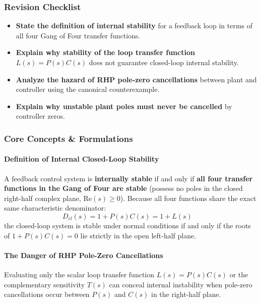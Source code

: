 \documentclass[12pt,onecolumn,twoside ]{article}
\begin{document}
	\subsubsection{Revision Checklist}
	\begin{itemize}
		\item[$\square$]
		\textbf{State the definition of internal stability} for a feedback loop in terms of all four Gang of Four transfer functions.
		\item[$\square$]
		\textbf{Explain why stability of the loop transfer function} $L(s) = P(s)C(s)$ does not guarantee closed-loop internal stability.
		\item[$\square$]
		\textbf{Analyze the hazard of RHP pole-zero cancellations} between plant and controller using the canonical counterexample.
		\item[$\square$]
		\textbf{Explain why unstable plant poles must never be cancelled} by controller zeros.
	\end{itemize}
	
	\subsubsection{Core Concepts \& Formulations}
	\paragraph{Definition of Internal Closed-Loop Stability}
	A feedback control system is \textbf{internally stable} if and only if \textbf{all four transfer functions in the Gang of Four are stable} (possess no poles in the closed right-half complex plane, $\text{Re}(s) \ge 0$). Because all four functions share the exact same characteristic denominator: \[
	D_{cl}(s) = 1 + P(s)C(s) = 1 + L(s) \quad
	\] the closed-loop system is stable under normal conditions if and only if the roots of $1 + P(s)C(s) = 0$ lie strictly in the open left-half plane.
	\paragraph{The Danger of RHP Pole-Zero Cancellations}
	Evaluating only the scalar loop transfer function $L(s) = P(s)C(s)$ or the complementary sensitivity $T(s)$ can conceal internal instability when pole-zero cancellations occur between $P(s)$ and $C(s)$ in the right-half plane.
\end{document}
